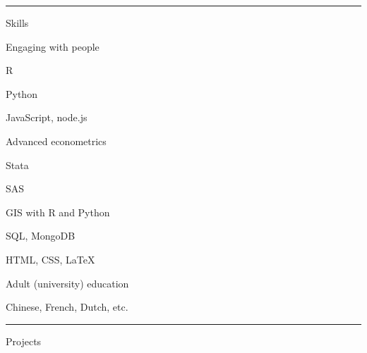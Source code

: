 \documentclass[letterpaper, english, 11pt]{article}
\newenvironment{packed_itemize}{
	\begin{itemize}
		\setlength{\itemsep}{1pt}
		\setlength{\parskip}{2pt}
		\setlength{\parsep}{2pt}
	} {\end{itemize}
}
\begin{document}
\hrule
 
Skills

\begin{footnotesize}
\begin{multicols}{3}
	\begin{packed_itemize}
		\item{Engaging with people}
		\item R
		\item Python
		\item JavaScript, node.js
		\item Advanced econometrics
		\item Stata
		\item SAS
		\item GIS with R and Python
		\item SQL, MongoDB
		\item HTML, CSS, \LaTeX
		\item Adult (university) education
		\item Chinese, French, Dutch, etc.
	\end{packed_itemize}
\end{multicols}
\end{footnotesize}
\vspace{2pt}
\hrule

Projects
\end{document}
